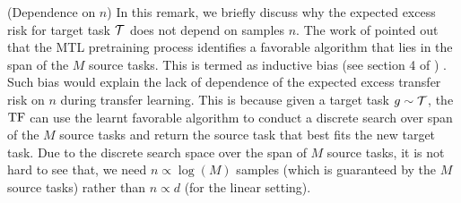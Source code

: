 \begin{remark} (Dependence on $n$)
\label{remark:target-risk}
In this remark, we briefly discuss why the expected excess risk for target task $\mathcal{T}$ does not depend on samples $n$. 
%
The work of \citet{li2023transformers} pointed out that the MTL pretraining process identifies a favorable algorithm that lies in the span of the $M$ source tasks.  
%
This is termed as inductive bias (see section 4 of \citet{li2023transformers}) \citep{soudry2018implicit, neyshabur2017geometry}. 
%
Such bias would explain the lack of dependence of the expected excess transfer risk on $n$ during transfer learning. 
%
%
This is because given a target task $g\sim\mathcal{T}$, the $\mathrm{TF}$ can use the learnt favorable algorithm to conduct a discrete search over span of the $M$ source tasks and return the source task that best fits the new target task. Due to the discrete search space over the span of $M$ source tasks, it is not hard to see that, we need $n \propto \log (M)$ samples (which is guaranteed by the $M$ source tasks) rather than $n \propto d$ (for the linear setting).
%
\end{remark}



